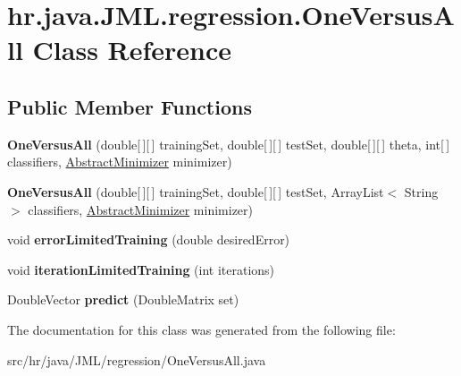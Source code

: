 \hypertarget{classhr_1_1java_1_1_j_m_l_1_1regression_1_1_one_versus_all}{\section{hr.\+java.\+J\+M\+L.\+regression.\+One\+Versus\+All Class Reference}
\label{classhr_1_1java_1_1_j_m_l_1_1regression_1_1_one_versus_all}
}
\subsection*{Public Member Functions}
\begin{DoxyCompactItemize}
\item 
\hypertarget{classhr_1_1java_1_1_j_m_l_1_1regression_1_1_one_versus_all_a40915e7a024e823e81488fe648ff8b7d}{{\bfseries One\+Versus\+All} (double\mbox{[}$\,$\mbox{]}\mbox{[}$\,$\mbox{]} training\+Set, double\mbox{[}$\,$\mbox{]}\mbox{[}$\,$\mbox{]} test\+Set, double\mbox{[}$\,$\mbox{]}\mbox{[}$\,$\mbox{]} theta, int\mbox{[}$\,$\mbox{]} classifiers, \hyperlink{classhr_1_1java_1_1_j_m_l_1_1learning_1_1_abstract_minimizer}{Abstract\+Minimizer} minimizer)}\label{classhr_1_1java_1_1_j_m_l_1_1regression_1_1_one_versus_all_a40915e7a024e823e81488fe648ff8b7d}

\item 
\hypertarget{classhr_1_1java_1_1_j_m_l_1_1regression_1_1_one_versus_all_a5ab53916e2a41e3a8e2c81d359beb837}{{\bfseries One\+Versus\+All} (double\mbox{[}$\,$\mbox{]}\mbox{[}$\,$\mbox{]} training\+Set, double\mbox{[}$\,$\mbox{]}\mbox{[}$\,$\mbox{]} test\+Set, Array\+List$<$ String $>$ classifiers, \hyperlink{classhr_1_1java_1_1_j_m_l_1_1learning_1_1_abstract_minimizer}{Abstract\+Minimizer} minimizer)}\label{classhr_1_1java_1_1_j_m_l_1_1regression_1_1_one_versus_all_a5ab53916e2a41e3a8e2c81d359beb837}

\item 
\hypertarget{classhr_1_1java_1_1_j_m_l_1_1regression_1_1_one_versus_all_a9df5980a7439bd6af0792ed8315c9d90}{void {\bfseries error\+Limited\+Training} (double desired\+Error)}\label{classhr_1_1java_1_1_j_m_l_1_1regression_1_1_one_versus_all_a9df5980a7439bd6af0792ed8315c9d90}

\item 
\hypertarget{classhr_1_1java_1_1_j_m_l_1_1regression_1_1_one_versus_all_a447ae53e368ae6125531f6fb35d5ad62}{void {\bfseries iteration\+Limited\+Training} (int iterations)}\label{classhr_1_1java_1_1_j_m_l_1_1regression_1_1_one_versus_all_a447ae53e368ae6125531f6fb35d5ad62}

\item 
\hypertarget{classhr_1_1java_1_1_j_m_l_1_1regression_1_1_one_versus_all_ac87907964da0bf8b9b190325f5f4be26}{Double\+Vector {\bfseries predict} (Double\+Matrix set)}\label{classhr_1_1java_1_1_j_m_l_1_1regression_1_1_one_versus_all_ac87907964da0bf8b9b190325f5f4be26}

\end{DoxyCompactItemize}


The documentation for this class was generated from the following file\+:\begin{DoxyCompactItemize}
\item 
src/hr/java/\+J\+M\+L/regression/One\+Versus\+All.\+java\end{DoxyCompactItemize}
